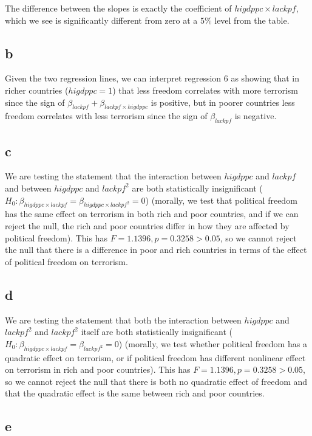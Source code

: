 \documentclass[12pt,letterpaper]{article}
\theoremstyle{definition}
\begin{document}
The difference between the slopes is exactly the coefficient of $higdppc \times lackpf$, which we see is significantly different from zero at a $5\%$ level from the table.

\subsection*{b}

Given the two regression lines, we can interpret regression 6 as showing that in richer countries ($higdppc = 1$) that less freedom correlates with more terrorism since the sign of $\beta_{lackpf} + \beta_{lackpf \times higdppc}$ is positive, but in poorer countries less freedom correlates with less terrorism since the sign of $\beta_{lackpf}$ is negative.

\subsection*{c}

We are testing the statement that the interaction between $higdppc$ and $lackpf$ and between $higdppc$ and $lackpf^{2}$ are both statistically insignificant ($H_{0}:\beta_{higdppc \times lackpf} = \beta_{higdppc \times lackpf^{2}} = 0$) (morally, we test that political freedom has the same effect on terrorism in both rich and poor countries, and if we can reject the null, the rich and poor countries differ in how they are affected by political freedom). This has $F = 1.1396, p = 0.3258 > 0.05$, so we cannot reject the null that there is a difference in poor and rich countries in terms of the effect of political freedom on terrorism.

\subsection*{d}

We are testing the statement that both the interaction between $higdppc$ and $lackpf^{2}$ and $lackpf^{2}$ itself are both statistically insignificant ($H_{0}:\beta_{higdppc \times lackpf} = \beta_{lackpf^{2}} = 0$) (morally, we test whether political freedom has a quadratic effect on terrorism, or if political freedom has different nonlinear effect on terrorism in rich and poor countries). This has $F = 1.1396, p = 0.3258 > 0.05$, so we cannot reject the null that there is both no quadratic effect of freedom and that the quadratic effect is the same between rich and poor countries.

\subsection*{e}
\end{document}
